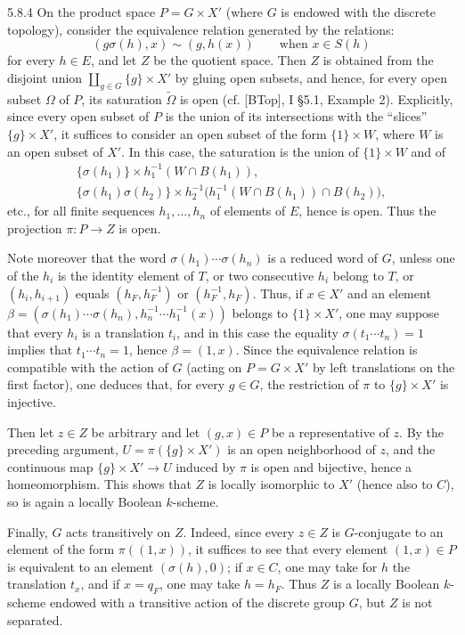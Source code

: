 \begin{example}{5.8.4}
On the product space $P=G\times X'$ (where $G$ is endowed with the discrete topology), consider the equivalence relation generated by the relations:
\[
(g\sigma(h),x)\sim(g,h(x))\qquad\text{when }x\in S(h)
\]
for every $h\in E$, and let $Z$ be the quotient space. Then $Z$ is obtained from the disjoint union $\coprod_{g\in G}\{g\}\times X'$ by gluing open subsets, and hence, for every open subset $\Omega$ of $P$, its saturation $\widetilde\Omega$ is open (cf. [BTop], I §5.1, Example 2). Explicitly, since every open subset of $P$ is the union of its intersections with the ``slices'' $\{g\}\times X'$, it suffices to consider an open subset of the form $\{1\}\times W$, where $W$ is an open subset of $X'$. In this case, the saturation is the union of $\{1\}\times W$ and of
\[
\begin{gathered}
\{\sigma(h_1)\}\times h_1^{-1}(W\cap B(h_1)),\\
\{\sigma(h_1)\sigma(h_2)\}\times h_2^{-1}\bigl(h_1^{-1}(W\cap B(h_1))\cap B(h_2)\bigr),
\end{gathered}
\]
etc., for all finite sequences $h_1,\ldots,h_n$ of elements of $E$, hence is open. Thus the projection $\pi:P\to Z$ is open.

Note moreover that the word $\sigma(h_1)\cdots\sigma(h_n)$ is a reduced word of $G$, unless one of the $h_i$ is the identity element of $T$, or two consecutive $h_i$ belong to $T$, or $(h_i,h_{i+1})$ equals $(h_F,h_F^{-1})$ or $(h_F^{-1},h_F)$. Thus, if $x\in X'$ and an element $\beta=(\sigma(h_1)\cdots\sigma(h_n),h_n^{-1}\cdots h_1^{-1}(x))$ belongs to $\{1\}\times X'$, one may suppose that every $h_i$ is a translation $t_i$, and in this case the equality $\sigma(t_1\cdots t_n)=1$ implies that $t_1\cdots t_n=1$, hence $\beta=(1,x)$. Since the equivalence relation is compatible with the action of $G$ (acting on $P=G\times X'$ by left translations on the first factor), one deduces that, for every $g\in G$, the restriction of $\pi$ to $\{g\}\times X'$ is injective.

Then let $z\in Z$ be arbitrary and let $(g,x)\in P$ be a representative of $z$. By the preceding argument, $U=\pi(\{g\}\times X')$ is an open neighborhood of $z$, and the continuous map $\{g\}\times X'\to U$ induced by $\pi$ is open and bijective, hence a homeomorphism. This shows that $Z$ is locally isomorphic to $X'$ (hence also to $C$), so is again a locally Boolean $k$-scheme.

Finally, $G$ acts transitively on $Z$. Indeed, since every $z\in Z$ is $G$-conjugate to an element of the form $\pi((1,x))$, it suffices to see that every element $(1,x)\in P$ is equivalent to an element $(\sigma(h),0)$; if $x\in C$, one may take for $h$ the translation $t_x$, and if $x=q_F$, one may take $h=h_F$. Thus $Z$ is a locally Boolean $k$-scheme endowed with a transitive action of the discrete group $G$, but $Z$ is not separated.
\end{example}

